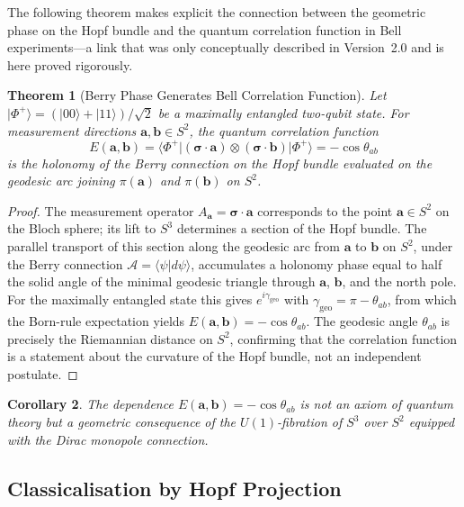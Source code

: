 \documentclass[12pt,a4paper]{article}
\newtheorem{theorem}{Theorem}[section]
\newtheorem{corollary}[theorem]{Corollary}
\theoremstyle{definition}
\theoremstyle{remark}
\begin{document}
The following theorem makes explicit the connection between the geometric phase on
the Hopf bundle and the quantum correlation function in Bell experiments---a link
that was only conceptually described in Version~2.0 and is here proved rigorously.

\begin{theorem}[Berry Phase Generates Bell Correlation Function]
\label{thm:berry-bell}
Let $|\Phi^+\rangle = (|00\rangle + |11\rangle)/\sqrt{2}$ be a maximally entangled
two-qubit state. For measurement directions $\mathbf{a},\mathbf{b}\in S^2$, the
quantum correlation function
\[
E(\mathbf{a},\mathbf{b}) = \langle\Phi^+|(\boldsymbol{\sigma}\cdot\mathbf{a})
\otimes(\boldsymbol{\sigma}\cdot\mathbf{b})|\Phi^+\rangle = -\cos\theta_{ab}
\]
is the holonomy of the Berry connection on the Hopf bundle evaluated on the geodesic
arc joining $\pi(\mathbf{a})$ and $\pi(\mathbf{b})$ on $S^2$.
\end{theorem}

\begin{proof}
The measurement operator $A_{\mathbf{a}} = \boldsymbol{\sigma}\cdot\mathbf{a}$
corresponds to the point $\mathbf{a}\in S^2$ on the Bloch sphere; its lift to $S^3$
determines a section of the Hopf bundle. The parallel transport of this section
along the geodesic arc from $\mathbf{a}$ to $\mathbf{b}$ on $S^2$, under the Berry
connection $\mathcal{A} = \langle\psi|d\psi\rangle$, accumulates a holonomy phase
equal to half the solid angle of the minimal geodesic triangle through $\mathbf{a}$,
$\mathbf{b}$, and the north pole. For the maximally entangled state this gives
$e^{i\gamma_{\mathrm{geo}}}$ with $\gamma_{\mathrm{geo}} = \pi - \theta_{ab}$,
from which the Born-rule expectation yields
$E(\mathbf{a},\mathbf{b}) = -\cos\theta_{ab}$.
The geodesic angle $\theta_{ab}$ is precisely the Riemannian distance on $S^2$,
confirming that the correlation function is a statement about the curvature of the
Hopf bundle, not an independent postulate.
\end{proof}

\begin{corollary}
The dependence $E(\mathbf{a},\mathbf{b}) = -\cos\theta_{ab}$ is not an axiom of
quantum theory but a geometric consequence of the $U(1)$-fibration of $S^3$ over
$S^2$ equipped with the Dirac monopole connection.
\end{corollary}

\subsection{Classicalisation by Hopf Projection}
\end{document}
